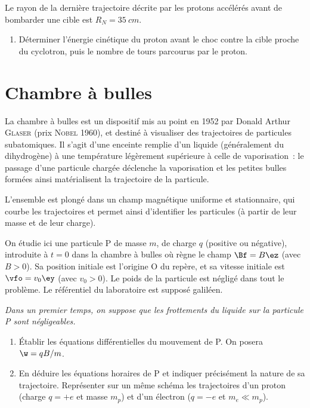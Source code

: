 \documentclass[a4paper, 12pt, final, garamond]{book}
\begin{document}
Le rayon de la dernière trajectoire décrite par les protons accélérés avant de
bombarder une cible est $R_N = \SI{35}{cm}$. \bigbreak

\begin{enumerate}[resume]
    \item Déterminer l'énergie cinétique du proton avant le choc contre la cible
        proche du cyclotron, puis le nombre de tours parcourus par le proton.
\end{enumerate}

\section{Chambre à bulles}

La chambre à bulles est un dispositif mis au point en 1952 par Donald Arthur
\textsc{Glaser} (prix \textsc{Nobel} 1960), et destiné à visualiser des
trajectoires de particules subatomiques. Il s'agit d'une enceinte remplie d'un
liquide (généralement du dihydrogène) à une température légèrement supérieure à
celle de vaporisation~: le passage d'une particule chargée déclenche la
vaporisation et les petites bulles formées ainsi matérialisent la trajectoire de
la particule. \bigbreak

L'ensemble est plongé dans un champ magnétique uniforme et
stationnaire, qui courbe les trajectoires et permet ainsi d'identifier les
particules (à partir de leur masse et de leur charge). \bigbreak

On étudie ici une particule P de masse $m$, de charge $q$ (positive ou
négative), introduite à $t = 0$ dans la chambre à bulles où règne le champ $\Bf
= B \ez$ (avec $B > 0$). Sa position initiale est l'origine O du repère, et sa
vitesse initiale est $\vfo = v_0\ey$ (avec $v_0 > 0$). Le poids de la particule
est négligé dans tout le problème. Le référentiel du laboratoire est supposé
galiléen. \bigbreak

\textit{Dans un premier temps, on suppose que les frottements du liquide sur la
particule P sont négligeables.} \bigbreak

\begin{enumerate}
    \item Établir les équations différentielles du mouvement de P. On posera $\w
        = qB/m$.
    \item En déduire les équations horaires de P et indiquer précisément la
        nature de sa trajectoire. Représenter sur un même schéma les
        trajectoires d'un proton (charge $q = +e$ et masse $m_p$) et d'un
        électron ($q = −e$ et $m_e \ll m_p$).
\end{enumerate} \bigbreak
\end{document}
